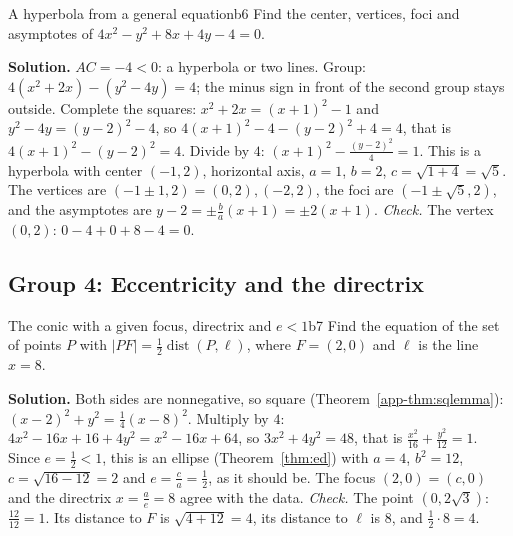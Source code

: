 \documentclass[11pt]{article}
\begin{document}
\begin{exmp}{A hyperbola from a general equation}{b6}
Find the center, vertices, foci and asymptotes of $4x^2-y^2+8x+4y-4=0$.

\textbf{Solution.} $AC=-4<0$: a hyperbola or two lines. Group: $4\left(x^2+2x\right)-\left(y^2-4y\right)=4$; the minus sign in front of the second group stays outside. Complete the squares: $x^2+2x=(x+1)^2-1$ and $y^2-4y=(y-2)^2-4$, so $4(x+1)^2-4-(y-2)^2+4=4$, that is $4(x+1)^2-(y-2)^2=4$. Divide by $4$: $(x+1)^2-\frac{(y-2)^2}4=1$. This is a hyperbola with center $(-1,2)$, horizontal axis, $a=1$, $b=2$, $c=\sqrt{1+4}=\sqrt5$. The vertices are $(-1\pm1,2)=(0,2),(-2,2)$, the foci are $\left(-1\pm\sqrt5,2\right)$, and the asymptotes are $y-2=\pm\frac ba(x+1)=\pm2(x+1)$.
\emph{Check.} The vertex $(0,2)$: $0-4+0+8-4=0$.
\end{exmp}

\subsection*{Group 4: Eccentricity and the directrix}

\begin{exmp}{The conic with a given focus, directrix and $e<1$}{b7}
Find the equation of the set of points $P$ with $\lvert PF\rvert=\frac12\operatorname{dist}(P,\ell)$, where $F=(2,0)$ and $\ell$ is the line $x=8$.

\textbf{Solution.} Both sides are nonnegative, so square (Theorem~\ref{app-thm:sqlemma}): $(x-2)^2+y^2=\frac14(x-8)^2$. Multiply by $4$: $4x^2-16x+16+4y^2=x^2-16x+64$, so $3x^2+4y^2=48$, that is $\frac{x^2}{16}+\frac{y^2}{12}=1$. Since $e=\frac12<1$, this is an ellipse (Theorem~\ref{thm:ed}) with $a=4$, $b^2=12$, $c=\sqrt{16-12}=2$ and $e=\frac ca=\frac12$, as it should be. The focus $(2,0)=(c,0)$ and the directrix $x=\frac ae=8$ agree with the data.
\emph{Check.} The point $\left(0,2\sqrt3\right)$: $\frac{12}{12}=1$. Its distance to $F$ is $\sqrt{4+12}=4$, its distance to $\ell$ is $8$, and $\frac12\cdot8=4$.
\end{exmp}
\end{document}
